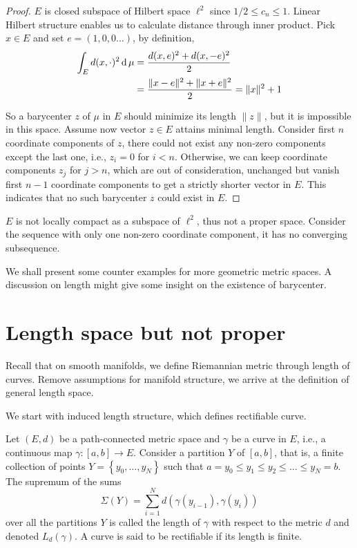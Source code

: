 \begin{proof}
	$E$ is closed subspace of Hilbert space $\ell^2$ since $ 1 / 2 \leq c_{n} \leq 1$.
	Linear Hilbert structure enables us to calculate distance through inner product.
	Pick $ x \in E$ and set $ e=(1,0,0\ldots)$, by definition,
	\begin{align*}
		\int_{E} d(x, \cdot)^2 \operatorname{d} \mu & = \frac{d(x,e)^2+d(x,-e)^2 }{2}                         \\
		                                 & =\frac{\| x - e \|^2 + \| x + e \|^2}{2} =\| x \|^2 + 1
	\end{align*}

	So a barycenter $z$ of $\mu$ in $E$ should minimize its length $\| z \|$,
	but it is impossible in this space.
	Assume now vector $z \in E$ attains minimal length.
	Consider first $n$ coordinate components of $z$,
	there could not exist any non-zero components except the last one, i.e., $z_i =0$ for $i<n$.
	Otherwise, we can keep coordinate components $z_j$ for $j>n$, which are out of consideration, unchanged but vanish first $n-1$ coordinate components to get a strictly shorter vector in $E$.
	This indicates that no such barycenter $z$ could exist in $E$.
\end{proof}

\begin{rmk}
	$E$ is not locally compact as a subspace of $\ell^2$, thus not a proper space.
	Consider the sequence with only one non-zero coordinate component, it has no converging subsequence.
\end{rmk}

We shall present some counter examples for more geometric metric spaces.
A discussion on length might give some insight on the existence of barycenter.

\section{Length space but not proper}

Recall that on smooth manifolds, we define Riemannian metric through length of curves.
Remove assumptions for manifold structure, we arrive at the definition of general length space.

We start with induced length structure, which defines rectifiable curve.
\begin{defn}
	\label{defn:length_structure}
	Let \( ( E , d ) \) be a path-connected metric space and \( \gamma \) be a curve in \( E \),
	i.e., a continuous map \( \gamma: [ a , b ] \rightarrow E \).
	Consider a partition \( Y \) of \( [ a , b ] \), that is,
	a finite collection of points \( Y = \left\{ y _ { 0 } , \ldots , y _ { N } \right\} \)
	such that \( a = y _ { 0 } \leq y _ { 1 } \leq y _ { 2 } \leq \ldots \leq y _ { N } = b \).
	The supremum of the sums
	\[
		\Sigma ( Y ) = \sum _ { i = 1 } ^ { N } d \left( \gamma \left( y _ { i - 1 } \right) , \gamma \left( y _ { i } \right) \right)
	\]
	over all the partitions $Y$ is called the length of $\gamma$ with respect to the metric $d$ and denoted $L_d (\gamma)$.
	A curve is said to be rectifiable if its length is finite.
\end{defn}

